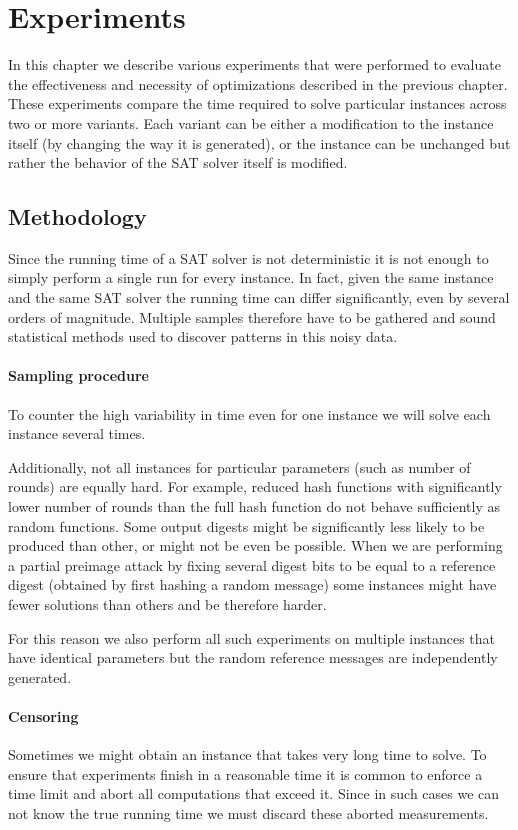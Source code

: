 \chapter{Experiments}

In this chapter we describe various experiments that were performed to evaluate the effectiveness and necessity of optimizations described in the previous chapter.
These experiments compare the time required to solve particular instances across two or more variants.
Each variant can be either a modification to the instance itself (by changing the way it is generated), or the instance can be unchanged but rather the behavior of the SAT solver itself is modified.

\section{Methodology}
Since the running time of a SAT solver is not deterministic it is not enough to simply perform a single run for every instance.
In fact, given the same instance and the same SAT solver the running time can differ significantly, even by several orders of magnitude.
Multiple samples therefore have to be gathered and sound statistical methods used to discover patterns in this noisy data.

\subsubsection{Sampling procedure}
To counter the high variability in time even for one instance we will solve each instance several times.

Additionally, not all instances for particular parameters (such as number of rounds) are equally hard.
For example, reduced hash functions with significantly lower number of rounds than the full hash function do not behave sufficiently as random functions.
Some output digests might be significantly less likely to be produced than other, or might not be even be possible.
When we are performing a partial preimage attack by fixing several digest bits to be equal to a reference digest (obtained by first hashing a random message) some instances might have fewer solutions than others and be therefore harder.

For this reason we also perform all such experiments on multiple instances that have identical parameters but the random reference messages are independently generated.

\subsubsection{Censoring}
Sometimes we might obtain an instance that takes very long time to solve.
To ensure that experiments finish in a reasonable time it is common to enforce a time limit and abort all computations that exceed it.
Since in such cases we can not know the true running time we must discard these aborted measurements.

